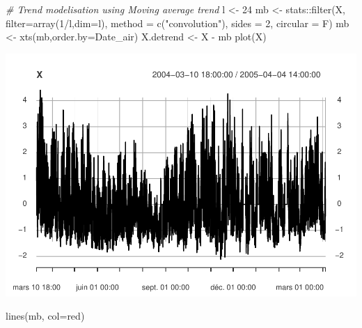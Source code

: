 \documentclass[
]{article}
\newenvironment{Shaded}{\begin{snugshade}}{\end{snugshade}}
\newcommand{\AttributeTok}[1]{\textcolor[rgb]{0.77,0.63,0.00}{#1}}
\newcommand{\CommentTok}[1]{\textcolor[rgb]{0.56,0.35,0.01}{\textit{#1}}}
\newcommand{\DecValTok}[1]{\textcolor[rgb]{0.00,0.00,0.81}{#1}}
\newcommand{\FunctionTok}[1]{\textcolor[rgb]{0.00,0.00,0.00}{#1}}
\newcommand{\NormalTok}[1]{#1}
\newcommand{\OtherTok}[1]{\textcolor[rgb]{0.56,0.35,0.01}{#1}}
\newcommand{\SpecialCharTok}[1]{\textcolor[rgb]{0.00,0.00,0.00}{#1}}
\newcommand{\StringTok}[1]{\textcolor[rgb]{0.31,0.60,0.02}{#1}}
\begin{document}
\begin{Shaded}
\begin{Highlighting}[]
\CommentTok{\# Trend modelisation using Moving average trend}
\NormalTok{l }\OtherTok{\textless{}{-}} \DecValTok{24}
\NormalTok{mb }\OtherTok{\textless{}{-}}\NormalTok{ stats}\SpecialCharTok{::}\FunctionTok{filter}\NormalTok{(X, }\AttributeTok{filter=}\FunctionTok{array}\NormalTok{(}\DecValTok{1}\SpecialCharTok{/}\NormalTok{l,}\AttributeTok{dim=}\NormalTok{l),}
                  \AttributeTok{method =} \FunctionTok{c}\NormalTok{(}\StringTok{"convolution"}\NormalTok{),}
                  \AttributeTok{sides =} \DecValTok{2}\NormalTok{, }\AttributeTok{circular =}\NormalTok{ F)}
\NormalTok{mb }\OtherTok{\textless{}{-}} \FunctionTok{xts}\NormalTok{(mb,}\AttributeTok{order.by=}\NormalTok{Date\_air)}
\NormalTok{X.detrend }\OtherTok{\textless{}{-}}\NormalTok{ X }\SpecialCharTok{{-}}\NormalTok{ mb}
\FunctionTok{plot}\NormalTok{(X)}
\end{Highlighting}
\end{Shaded}

\includegraphics{STA202_report_files/figure-latex/unnamed-chunk-11-6.pdf}

\begin{Shaded}
\begin{Highlighting}[]
\FunctionTok{lines}\NormalTok{(mb, }\AttributeTok{col=}\StringTok{\textquotesingle{}red\textquotesingle{}}\NormalTok{)}
\end{Highlighting}
\end{Shaded}
\end{document}
